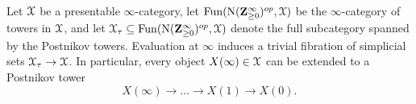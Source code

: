 
%




\begin{lemma}\label{tow}
Let $\operatorname{\mathcal{X}}$ be a presentable $\infty$-category, let $\operatorname{Fun}(\operatorname{N} (\mathbf{Z}_{\geq 0}^{\infty})^{op}, \operatorname{\mathcal{X}})$ be the $\infty$-category of towers in $\operatorname{\mathcal{X}}$, and let $\operatorname{\mathcal{X}}_{\tau} \subseteq 
\operatorname{Fun}( \operatorname{N} (\mathbf{Z}_{\geq 0}^{\infty})^{op}, \operatorname{\mathcal{X}})$ denote the full subcategory spanned by the Postnikov towers. Evaluation at $\infty$ induces a trivial fibration of simplicial sets
$ \operatorname{\mathcal{X}}_{\tau} \rightarrow \operatorname{\mathcal{X}}$. In particular, every object $X(\infty) \in \operatorname{\mathcal{X}}$ can be extended to a Postnikov tower 
$$ X(\infty) \rightarrow \ldots \rightarrow X(1) \rightarrow X(0).$$
\end{lemma}

